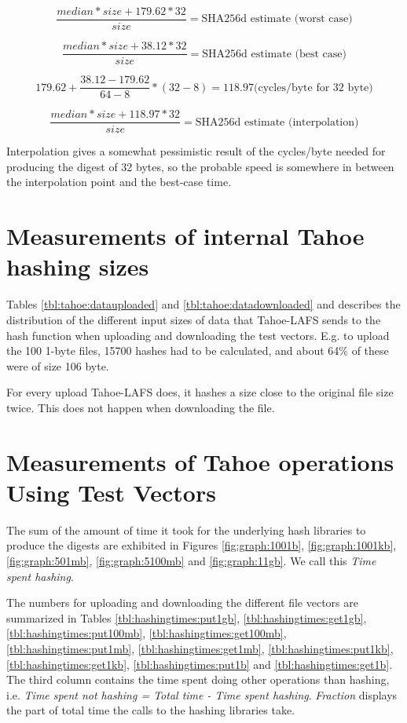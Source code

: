 \documentclass[english,12pt,a4paper]{book}
\begin{document}
$$\frac{median * size + 179.62*32}{size} = \text{SHA256d estimate (worst case)}$$

$$\frac{median * size + 38.12*32}{size} = \text{SHA256d estimate (best case)}$$

$$179.62 + \frac{38.12-179.62}{64-8}*(32-8) = 118.97 \text{(cycles/byte for 32 byte)}$$

$$\frac{median * size + 118.97*32}{size} = \text{SHA256d estimate (interpolation)}$$



Interpolation gives a somewhat pessimistic result of the cycles/byte needed for
producing the digest of 32 bytes, so the probable speed is somewhere in between the
interpolation point and the best-case time.

\section{Measurements of internal Tahoe hashing sizes}
\label{sec:results:tahoedata}

Tables \ref{tbl:tahoe:datauploaded} and \ref{tbl:tahoe:datadownloaded} and
describes the distribution of the different input sizes of data that
Tahoe-\ac{LAFS} sends to the hash function when uploading and downloading the
test vectors. E.g. to upload the 100 1-byte files, 15700 hashes had to be
calculated, and about 64\% of these were of size 106 byte.

For every upload Tahoe-\ac{LAFS} does, it hashes a size close to the original
file size twice. This does not happen when downloading the file.



\section{Measurements of Tahoe operations Using Test Vectors}

The sum of the amount of time it took for the underlying hash libraries to
produce the digests are exhibited in Figures \ref{fig:graph:1001b},
\ref{fig:graph:1001kb}, \ref{fig:graph:501mb}, \ref{fig:graph:5100mb} and
\ref{fig:graph:11gb}. We call this \emph{Time spent hashing}.

The numbers for uploading and downloading the different file vectors are
summarized in Tables \ref{tbl:hashingtimes:put1gb},
\ref{tbl:hashingtimes:get1gb}, \ref{tbl:hashingtimes:put100mb},
\ref{tbl:hashingtimes:get100mb}, \ref{tbl:hashingtimes:put1mb},
\ref{tbl:hashingtimes:get1mb}, \ref{tbl:hashingtimes:put1kb},
\ref{tbl:hashingtimes:get1kb}, \ref{tbl:hashingtimes:put1b} and
\ref{tbl:hashingtimes:get1b}.  The third column contains the time spent doing
other operations than hashing, i.e. \emph{Time spent not hashing = Total time -
Time spent hashing}. \emph{Fraction} displays the part of total time the calls
to the hashing libraries take.
\end{document}
